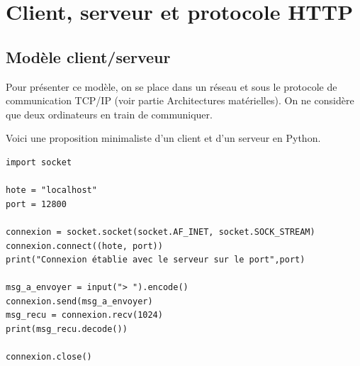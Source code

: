 \chapter{Client, serveur et protocole HTTP}

\section{Modèle client/serveur}

Pour présenter ce modèle, on se place dans un réseau et sous le protocole de communication TCP/IP (voir partie Architectures matérielles). On ne considère que deux ordinateurs en train de communiquer.


Voici une proposition minimaliste d'un client et d'un serveur en Python.

\begin{verbatim}
import socket

hote = "localhost"
port = 12800

connexion = socket.socket(socket.AF_INET, socket.SOCK_STREAM)
connexion.connect((hote, port))
print("Connexion établie avec le serveur sur le port",port)

msg_a_envoyer = input("> ").encode()
connexion.send(msg_a_envoyer)
msg_recu = connexion.recv(1024)
print(msg_recu.decode())

connexion.close()
\end{verbatim}

